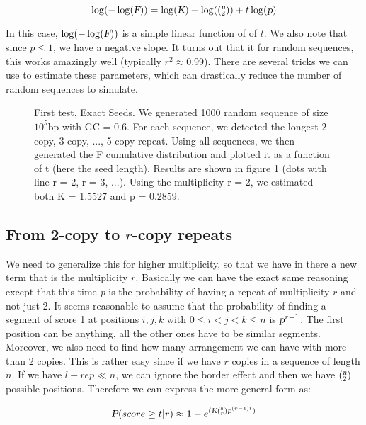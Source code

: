 \documentclass{ws-procs9x6}
\begin{document}
\begin{equation}
\log(-\log(\textsl{F}))= \log(\textsl{K})+\log((_{2}^\textsl{n}))+t\log(\textsl{p})
\end{equation}

In this case, $\log(-\log(\textsl{F}))$ is a simple linear function of of $t$. We also note that since
$p \leq 1$, we have a negative slope. It turns out that it for random sequences, this works
amazingly well (typically $r^{2}\approx 0.99$). There are several tricks we can use to estimate these parameters, which can
 drastically reduce the number of random sequences to simulate.

\begin{figure}[t]
\centering {}
\caption{First test, Exact Seeds. We generated 1000 random sequence of size $10^{5}$bp with GC = 0.6. For each sequence,
we detected the longest 2-copy, 3-copy, ..., 5-copy repeat. Using all sequences, we then generated the F
cumulative distribution and plotted it as a function of t (here the seed length). Results
are shown in figure 1 (dots with line r = 2, r = 3, ...). Using the multiplicity r = 2, we
estimated both K = 1.5527 and p = 0.2859.}

\label{fig-hmm}\vspace{-0.2cm}
\end{figure}
\subsection{From 2-copy to $r$-copy repeats}
We need to generalize this for higher multiplicity, so that we have in there a new term that
is the multiplicity $r$. Basically we can have the exact same reasoning except that this time \textsl{p} is the probability
of having a repeat of multiplicity $r$ and not just 2. It seems reasonable to assume that the
probability of finding a segment of score 1 at positions $i, j, k$ with $0 \leq i < j < k \leq n$ is
$\textsl{p}^{r-1}$. The first position can be anything, all the other ones have to be similar segments.
Moreover, we also need to find how many arrangement we can have with more than 2
copies. This is rather easy since if we have $r$ copies in a sequence of length $n$. If we have
$l-{rep}\ll n$, we can ignore the border effect and then we have $(_{2}^\textsl{n})$
possible positions. Therefore we can express the more general form as:

\begin{equation}
\textsl{P}(score \geq t|r) \approx 1-e^{(\textsl{K}(_{r}^\textsl{n})\textsl{p}^{(r-1)t})}
\end{equation}
\end{document}
